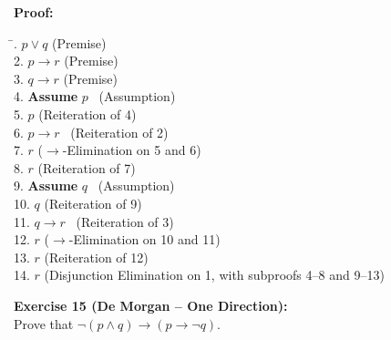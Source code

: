 \documentclass[12pt]{article}
\begin{document}
\textbf{Proof:}
\begin{tabbing}
\hspace*{2cm}\= . \quad \(p\lor q\) \quad \quad \quad (Premise)\\[0.5em]
2. \quad \(p\to r\) \quad \quad \quad (Premise)\\[0.5em]
3. \quad \(q\to r\) \quad \quad \quad (Premise)\\[0.5em]
4. \quad \textbf{Assume } \(p\) \quad \quad \ (Assumption)\\[0.5em]
5. \quad \(p\) \quad \quad \quad (Reiteration of 4)\\[0.5em]
6. \quad \(p\to r\) \quad \quad \ (Reiteration of 2)\\[0.5em]
7. \quad \(r\) \quad \quad \quad (\(\to\)-Elimination on 5 and 6)\\[0.5em]
8. \quad \(r\) \quad \quad \quad (Reiteration of 7)\\[0.5em]
9. \quad \textbf{Assume } \(q\) \quad \quad \ (Assumption)\\[0.5em]
10. \quad \(q\) \quad \quad \quad (Reiteration of 9)\\[0.5em]
11. \quad \(q\to r\) \quad \quad \ (Reiteration of 3)\\[0.5em]
12. \quad \(r\) \quad \quad \quad (\(\to\)-Elimination on 10 and 11)\\[0.5em]
13. \quad \(r\) \quad \quad \quad (Reiteration of 12)\\[0.5em]
14. \quad \(r\) \quad \quad \quad (Disjunction Elimination on 1, with subproofs 4–8 and 9–13)
\end{tabbing}

\bigskip
\textbf{Exercise 15 (De Morgan – One Direction):}\\[0.3em]
Prove that \(\lnot(p\land q)\to (p\to \lnot q)\).
\end{document}

